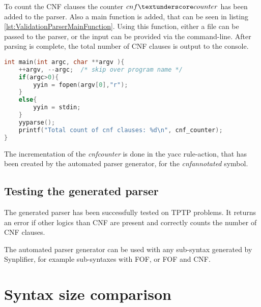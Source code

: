 To count the \ac{CNF} clauses the counter $cnf\textunderscore counter$ has been added to the parser.
Also a main function is added, that can be seen in listing \ref{lst:ValidationParserMainFunction}.
Using this function, either a file can be passed to the parser, or the input can be provided via the command-line.
After parsing is complete, the total number of \ac{CNF} clauses is output to the console.

\begin{lstlisting}[language=c, basicstyle=\scriptsize	,caption= \ac{CNF} parser main-function,label= lst:ValidationParserMainFunction]
 int main(int argc, char **argv ){
    ++argv, --argc;  /* skip over program name */
    if(argc>0){
        yyin = fopen(argv[0],"r");
    }
    else{
        yyin = stdin;
    }
    yyparse();
    printf("Total count of cnf clauses: %d\n", cnf_counter);
}
\end{lstlisting}
The incrementation of the \textit{cnf\textunderscore counter} is done in the yacc rule-action, that has been created  by the automated parser generator, for the \textit{cnf\textunderscore annotated} symbol.

\subsection{Testing the generated parser}\label{sec:ValidationAutomatedParserGeneration}

The generated parser has been successfully tested on \ac{TPTP} problems.
It returns an error if other logics than \ac{CNF} are present and correctly counts the number of \ac{CNF} clauses.

The automated parser generator can be used with any sub-syntax generated by \ac{Synplifier}, for example sub-syntaxes with \ac{FOF}, or \ac{FOF} and \ac{CNF}.

\section{Syntax size comparison}\label{sec:ValidationSyntaxSizeComparison}

